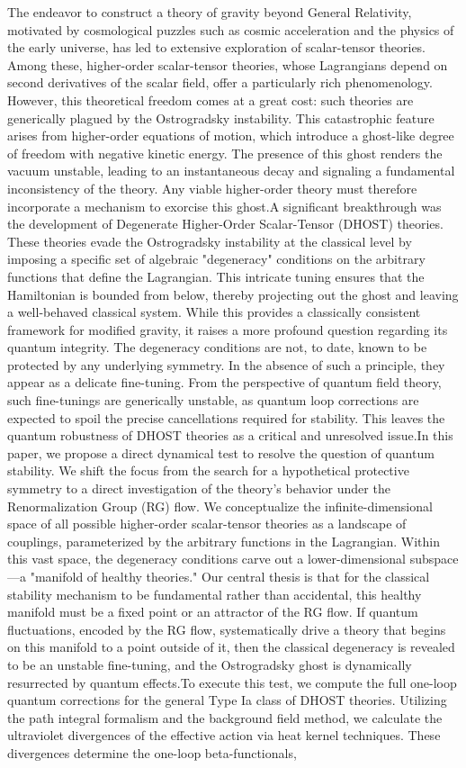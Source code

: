 \documentclass[twocolumn]{aastex631}
\begin{document}
The endeavor to construct a theory of gravity beyond General Relativity, motivated by cosmological puzzles such as cosmic acceleration and the physics of the early universe, has led to extensive exploration of scalar-tensor theories. Among these, higher-order scalar-tensor theories, whose Lagrangians depend on second derivatives of the scalar field, offer a particularly rich phenomenology. However, this theoretical freedom comes at a great cost: such theories are generically plagued by the Ostrogradsky instability. This catastrophic feature arises from higher-order equations of motion, which introduce a ghost-like degree of freedom with negative kinetic energy. The presence of this ghost renders the vacuum unstable, leading to an instantaneous decay and signaling a fundamental inconsistency of the theory. Any viable higher-order theory must therefore incorporate a mechanism to exorcise this ghost.A significant breakthrough was the development of Degenerate Higher-Order Scalar-Tensor (DHOST) theories. These theories evade the Ostrogradsky instability at the classical level by imposing a specific set of algebraic "degeneracy" conditions on the arbitrary functions that define the Lagrangian. This intricate tuning ensures that the Hamiltonian is bounded from below, thereby projecting out the ghost and leaving a well-behaved classical system. While this provides a classically consistent framework for modified gravity, it raises a more profound question regarding its quantum integrity. The degeneracy conditions are not, to date, known to be protected by any underlying symmetry. In the absence of such a principle, they appear as a delicate fine-tuning. From the perspective of quantum field theory, such fine-tunings are generically unstable, as quantum loop corrections are expected to spoil the precise cancellations required for stability. This leaves the quantum robustness of DHOST theories as a critical and unresolved issue.In this paper, we propose a direct dynamical test to resolve the question of quantum stability. We shift the focus from the search for a hypothetical protective symmetry to a direct investigation of the theory's behavior under the Renormalization Group (RG) flow. We conceptualize the infinite-dimensional space of all possible higher-order scalar-tensor theories as a landscape of couplings, parameterized by the arbitrary functions in the Lagrangian. Within this vast space, the degeneracy conditions carve out a lower-dimensional subspace---a "manifold of healthy theories." Our central thesis is that for the classical stability mechanism to be fundamental rather than accidental, this healthy manifold must be a fixed point or an attractor of the RG flow. If quantum fluctuations, encoded by the RG flow, systematically drive a theory that begins on this manifold to a point outside of it, then the classical degeneracy is revealed to be an unstable fine-tuning, and the Ostrogradsky ghost is dynamically resurrected by quantum effects.To execute this test, we compute the full one-loop quantum corrections for the general Type Ia class of DHOST theories. Utilizing the path integral formalism and the background field method, we calculate the ultraviolet divergences of the effective action via heat kernel techniques. These divergences determine the one-loop beta-functionals, 
\end{document}
